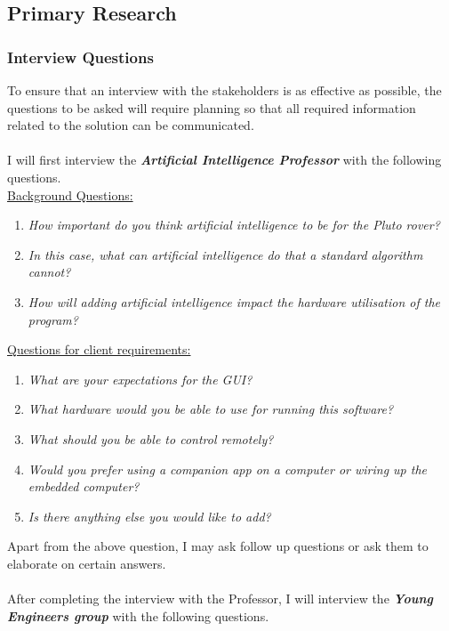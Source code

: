 \documentclass[11pt]{report}
\begin{document}
	\subsection{Primary Research}
		\subsubsection{Interview Questions}

			To ensure that an interview with the stakeholders is as effective as possible, the questions to be asked will require planning so that all required information related to the solution can be communicated. \\\\
			I will first interview the \textbf{\emph{Artificial Intelligence Professor}} with the following questions.\\

			\underline{Background Questions:}
				\begin{enumerate}
					\item{\emph{How important do you think artificial intelligence to be for the Pluto rover?}}
					\item{\emph{In this case, what can artificial intelligence do that a standard algorithm cannot?}}
					\item{\emph{How will adding artificial intelligence impact the hardware utilisation of the program?}}
				\end{enumerate}

			\underline{Questions for client requirements:}
				\begin{enumerate}
					\item{\emph{What are your expectations for the GUI?}}
					\item{\emph{What hardware would you be able to use for running this software?}}
					\item{\emph{What should you be able to control remotely?}}
					\item{\emph{Would you prefer using a companion app on a computer or wiring up the embedded computer?}}
					\item{\emph{Is there anything else you would like to add?}}
				\end{enumerate}
			Apart from the above question, I may ask follow up questions or ask them to elaborate on certain answers.\\
			\\
			After completing the interview with the Professor, I will interview the \textbf{\emph{Young Engineers group}} with the following questions.\\
\end{document}
